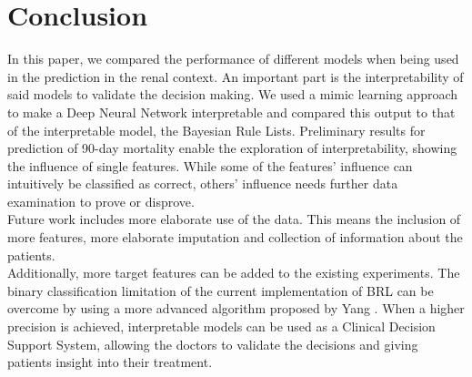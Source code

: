 \documentclass[conference,comsoc]{IEEEtran}
\begin{document}
\section{Conclusion}
In this paper, we compared the performance of different models when being used in the prediction in the renal context.
An important part is the interpretability of said models to validate the decision making.
We used a mimic learning approach to make a Deep Neural Network interpretable and compared this output to that of the interpretable model, the Bayesian Rule Lists.
Preliminary results for prediction of 90-day mortality enable the exploration of interpretability, showing the influence of single features.
While some of the features' influence can intuitively be classified as correct, others' influence needs further data examination to prove or disprove. \\

Future work includes more elaborate use of the data. 
This means the inclusion of more features, more elaborate imputation and collection of information about the patients. \\
Additionally, more target features can be added to the existing experiments. 
The binary classification limitation of the current implementation of BRL can be overcome by using a more advanced algorithm proposed by Yang \cite{Yang2016}.
When a higher precision is achieved, interpretable models can be used as a Clinical Decision Support System, allowing the doctors to validate the decisions and giving patients insight into their treatment.




\end{document}
